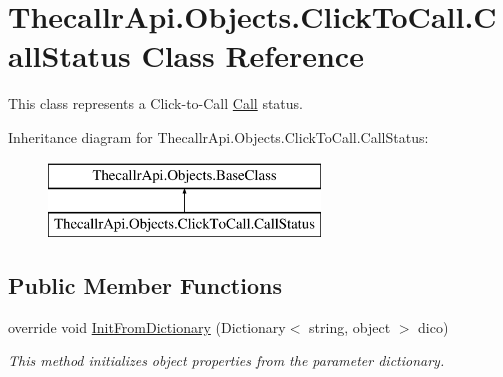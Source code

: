 \hypertarget{class_thecallr_api_1_1_objects_1_1_click_to_call_1_1_call_status}{\section{Thecallr\+Api.\+Objects.\+Click\+To\+Call.\+Call\+Status Class Reference}
\label{class_thecallr_api_1_1_objects_1_1_click_to_call_1_1_call_status}
}


This class represents a Click-\/to-\/\+Call \hyperlink{class_thecallr_api_1_1_objects_1_1_click_to_call_1_1_call}{Call} status.  


Inheritance diagram for Thecallr\+Api.\+Objects.\+Click\+To\+Call.\+Call\+Status\+:\begin{figure}[H]
\begin{center}
\leavevmode
\includegraphics[height=2.000000cm]{class_thecallr_api_1_1_objects_1_1_click_to_call_1_1_call_status}
\end{center}
\end{figure}
\subsection*{Public Member Functions}
\begin{DoxyCompactItemize}
\item 
override void \hyperlink{class_thecallr_api_1_1_objects_1_1_click_to_call_1_1_call_status_ab4286fd165183b5ff9449e2edea202bb}{Init\+From\+Dictionary} (Dictionary$<$ string, object $>$ dico)
\begin{DoxyCompactList}\small\item\em This method initializes object properties from the parameter dictionary. \end{DoxyCompactList}\end{DoxyCompactItemize}
